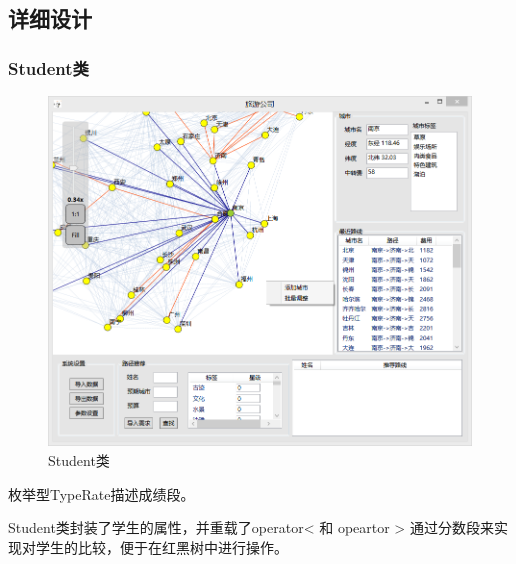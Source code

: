 \documentclass[12pt,a4paper]{article}
\begin{document}
\subsection{详细设计}
\subsubsection{Student类}
\begin{figure}[H]
\centering
\includegraphics[scale = 1]{3.png}
\caption{Student类} 
\end{figure}
枚举型TypeRate描述成绩段。\par
Student类封装了学生的属性，并重载了operator< 和 opeartor > 通过分数段来实现对学生的比较，便于在红黑树中进行操作。
\end{document}
